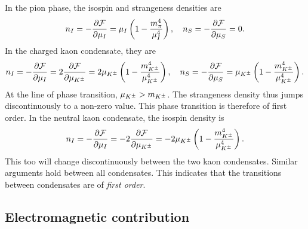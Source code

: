 In the pion phase, the isospin and strangeness densities are
%
\begin{equation}
    n_I = - \pdv{\mathcal{F}}{\mu_I} = \mu_I \left( 1 - \frac{m_\pi^4}{\mu_I^4} \right), \quad
    n_S = - \pdv{\mathcal{F}}{\mu_S} = 0.
\end{equation}
%
In the charged kaon condensate, they are
%
\begin{equation}
    n_I = - \pdv{\mathcal{F}}{\mu_I} = 2 \pdv{\mathcal{F}}{\mu_{K^\pm}}
    = 2\mu_{K^\pm} \left( 1 - \frac{m_{K^\pm}^4}{\mu_{K^\pm}^4} \right), \quad
    n_S = - \pdv{\mathcal{F}}{\mu_S} = \mu_{K^\pm} \left( 1 - \frac{m_{K^\pm}^4}{\mu_{K^\pm}^4} \right).
\end{equation}
%
At the line of phase transition, $\mu_{K^\pm} > m_{K^\pm}$.
The strangeness density thus jumps discontinuously to a non-zero value.
This phase transition is therefore of first order.
In the neutral kaon condensate, the isospin density is
%
\begin{equation}
    n_I = - \pdv{\mathcal{F}}{\mu_I} = -2 \pdv{\mathcal{F}}{\mu_{K^\pm}}
    = - 2 \mu_{K^\pm} \left( 1 - \frac{m_{K^\pm}^4}{\mu_{K^\pm}^4} \right).
\end{equation}
%
This too will change discontinuously between the two kaon condensates.
Similar arguments hold between all condensates.
This indicates that the transitions between condensates are of \emph{first order}.



\subsection{Electromagnetic contribution}

